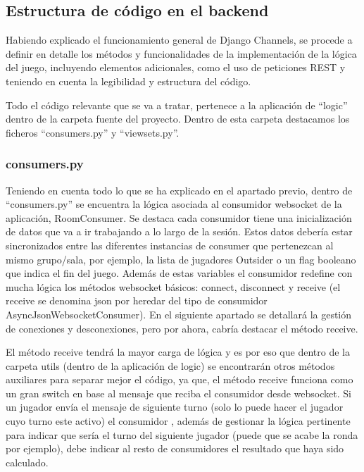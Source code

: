 \subsection{Estructura de código en el backend}

Habiendo explicado el funcionamiento general de Django Channels, se procede a definir en detalle los métodos y funcionalidades 
de la implementación de la lógica del juego, incluyendo elementos adicionales, como el uso de peticiones REST y teniendo en cuenta 
la legibilidad y estructura del código.

Todo el código relevante que se va a tratar, pertenece a la aplicación de ``logic'' dentro de la carpeta fuente del proyecto.
Dentro de esta carpeta destacamos los ficheros ``consumers.py'' y ``viewsets.py''.

\subsubsection{consumers.py}
Teniendo en cuenta todo lo que se ha explicado en el apartado previo, dentro de ``consumers.py'' se encuentra la lógica asociada
al consumidor websocket de la aplicación, RoomConsumer. Se destaca cada consumidor tiene una inicialización de datos que va a ir trabajando
a lo largo de la sesión. Estos datos debería estar sincronizados entre las diferentes instancias de consumer que pertenezcan 
al mismo grupo/sala, por ejemplo, la lista de jugadores Outsider o un flag booleano que indica el fin del juego. Además de estas variables el consumidor 
redefine con mucha lógica los métodos websocket básicos: connect, disconnect y receive (el receive se denomina json por heredar del tipo de consumidor 
AsyncJsonWebsocketConsumer). En el siguiente apartado se detallará la gestión de conexiones y desconexiones, pero por ahora, cabría destacar el método receive.

El método receive tendrá la mayor carga de lógica y es por eso que dentro de la carpeta utils (dentro de la aplicación de logic) se encontrarán
otros métodos auxiliares para separar mejor el código, ya que, el método receive funciona como un gran switch en base al mensaje que reciba el
consumidor desde websocket. Si un jugador envía el mensaje de siguiente turno (solo lo puede hacer el jugador cuyo turno este activo) el consumidor 
, además de gestionar la lógica pertinente para indicar que sería el turno del siguiente jugador (puede que se acabe la ronda por ejemplo), debe indicar
al resto de consumidores el resultado que haya sido calculado.

